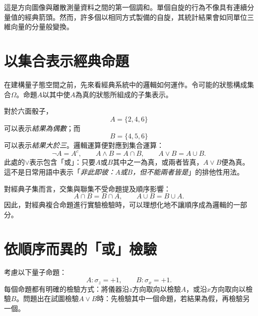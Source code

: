 \begin{classroomqa}
\end{classroomqa}

這是方向圖像與離散測量資料之間的第一個調和。單個自旋的行為不像具有連續分量值的經典箭頭。然而，許多個以相同方式製備的自旋，其統計結果會如同單位三維向量的分量般變換。

\section{以集合表示經典命題}

在建構量子態空間之前，先來看經典系統中的邏輯如何運作。令可能的狀態構成集合\(\Omega\)。命題\(A\)以其中使\(A\)為真的狀態所組成的子集表示。

對於六面骰子，
\[
A=\{2,4,6\}
\]
可以表示\emph{結果為偶數}；而
\[
B=\{4,5,6\}
\]
可以表示\emph{結果大於三}。邏輯運算便對應到集合運算：
\begin{equation}
\neg A=A^c,\qquad
A\land B=A\cap B,\qquad
A\lor B=A\cup B.
\label{eq:classical-logic}
\end{equation}
此處的\(\lor\)表示包含「或」：只要\(A\)或\(B\)其中之一為真，或兩者皆真，\(A\lor B\)便為真。這不是日常用語中表示「\emph{非此即彼：\(A\)或\(B\)，但不能兩者皆是}」的排他性用法。

\begin{classroomqa}
\end{classroomqa}

對經典子集而言，交集與聯集不受命題提及順序影響：
\[
A\cap B=B\cap A,\qquad A\cup B=B\cup A.
\]
因此，對經典複合命題進行實驗檢驗時，可以理想化地不讓順序成為邏輯的一部分。

\section{依順序而異的「或」檢驗}

考慮以下量子命題：
\begin{equation}
A:\sigma_z=+1,\qquad B:\sigma_x=+1.
\end{equation}
每個命題都有明確的檢驗方式：將儀器沿\(z\)方向取向以檢驗\(A\)，或沿\(x\)方向取向以檢驗\(B\)。問題出在試圖檢驗\(A\lor B\)時：先檢驗其中一個命題，若結果為假，再檢驗另一個。

